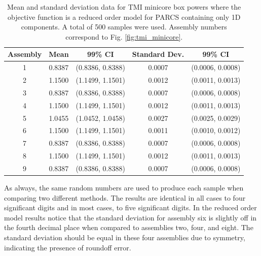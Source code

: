 %
\begin{table}[!htb] 
\caption[Mean and standard deviation data for \ac{TMI} minicore box powers where the objective function is a reduced order model for \ac{PARCS} containing only 1D components.]{\label{table:tmi_mean_sd_1d} 
Mean and standard deviation data for \ac{TMI} minicore box powers where the objective function is a reduced order model for \ac{PARCS} containing only 1D components. A total of 500 samples were used. Assembly numbers correspond to Fig. \ref{fig:tmi_minicore}.}
\centering
\begin{tabular}{||c|c|c|c|c||} 
\hline \hline
\textbf{Assembly} & \textbf{Mean} & \textbf{99\% CI} & \textbf{Standard Dev.} & \textbf{99\% CI} \\ \hline
1 & 0.8387 & (0.8386, 0.8388) & 0.0007 & (0.0006, 0.0008) \\ \hline 
2 & 1.1500 & (1.1499, 1.1501) & 0.0012 & (0.0011, 0.0013) \\ \hline
3 & 0.8387 & (0.8386, 0.8388) & 0.0007 & (0.0006, 0.0008) \\ \hline
4 & 1.1500 & (1.1499, 1.1501) & 0.0012 & (0.0011, 0.0013) \\ \hline
5 & 1.0455 & (1.0452, 1.0458) & 0.0027 & (0.0025, 0.0029) \\ \hline
6 & 1.1500 & (1.1499, 1.1501) & 0.0011 & (0.0010, 0.0012) \\ \hline
7 & 0.8387 & (0.8386, 0.8388) & 0.0007 & (0.0006, 0.0008) \\ \hline
8 & 1.1500 & (1.1499, 1.1501) & 0.0012 & (0.0011, 0.0013) \\ \hline
9 & 0.8387 & (0.8386, 0.8388) & 0.0007 & (0.0006, 0.0008) \\
\hline \hline
\end{tabular}
\end{table}
%
As always, the same random numbers are used to produce each sample when comparing two different methods. The results are identical in all cases to four significant digits and in most cases, to five significant digits. In the reduced order model results notice that the standard deviation for assembly six is slightly off in the fourth decimal place when compared to assemblies two, four, and eight. The standard deviation should be equal in these four assemblies due to symmetry, indicating the presence of roundoff error.        

